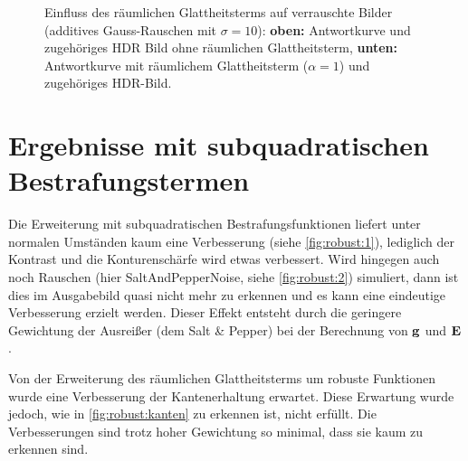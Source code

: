 \begin{figure}
  \begin{center}
    
    \caption{Einfluss des räumlichen Glattheitsterms auf verrauschte Bilder (additives Gauss-Rauschen mit $\sigma = 10$): \textbf{oben:} Antwortkurve und zugehöriges HDR Bild ohne räumlichen Glattheitsterm, \textbf{unten:} Antwortkurve mit räumlichem Glattheitsterm ($\alpha = 1$) und zugehöriges HDR-Bild.}
    \label{fig:raum:2}
  \end{center}
\end{figure}

\section{Ergebnisse mit subquadratischen Bestrafungstermen}

Die Erweiterung mit subquadratischen Bestrafungsfunktionen liefert unter normalen Umständen kaum eine Verbesserung (siehe \autoref{fig:robust:1}), lediglich der Kontrast und die Konturenschärfe wird etwas verbessert. Wird hingegen auch noch Rauschen (hier \gls{SaltAndPepperNoise}, siehe \autoref{fig:robust:2}) simuliert, dann ist dies im Ausgabebild quasi nicht mehr zu erkennen und es kann eine eindeutige Verbesserung erzielt werden. Dieser Effekt entsteht durch die geringere Gewichtung der Ausreißer (dem Salt \& Pepper) bei der Berechnung von $\mathbf g$ und $\mathbf E$.


Von der Erweiterung des räumlichen Glattheitsterms um robuste Funktionen wurde eine Verbesserung der Kantenerhaltung erwartet. Diese Erwartung wurde jedoch, wie in \autoref{fig:robust:kanten} zu erkennen ist, nicht erfüllt. Die Verbesserungen sind trotz hoher Gewichtung so minimal, dass sie kaum zu erkennen sind.


